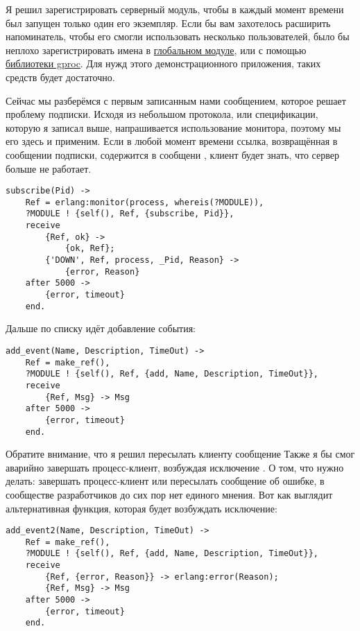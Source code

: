 Я решил зарегистрировать серверный модуль, чтобы в каждый момент времени был запущен только один его экземпляр.
Если бы вам захотелось расширить напоминатель, чтобы его смогли использовать несколько пользователей, было бы неплохо зарегистрировать имена в \href{http://erldocs.com/R15B/stdlib/global.html}{глобальном модуле}, или с помощью \href{http://github.com/uwiger/gproc}{библиотеки gproc}.
Для нужд этого демонстрационного приложения, таких средств будет достаточно.

Сейчас мы разберёмся с первым записанным нами сообщением, которое решает проблему подписки.
Исходя из небольшом протокола, или спецификации, которую я записал выше, напрашивается использование монитора, поэтому мы его здесь и применим.
Если в любой момент времени ссылка, возвращённая в сообщении подписки, содержится в сообщени , клиент будет знать, что сервер больше не работает.
\begin{lstlisting}[style=erlang]
subscribe(Pid) ->
    Ref = erlang:monitor(process, whereis(?MODULE)),
    ?MODULE ! {self(), Ref, {subscribe, Pid}},
    receive
        {Ref, ok} ->
            {ok, Ref};
        {'DOWN', Ref, process, _Pid, Reason} ->
            {error, Reason}
    after 5000 ->
        {error, timeout}
    end.
\end{lstlisting}

Дальше по списку идёт добавление события:
\begin{lstlisting}[style=erlang]
add_event(Name, Description, TimeOut) ->
    Ref = make_ref(),
    ?MODULE ! {self(), Ref, {add, Name, Description, TimeOut}},
    receive
        {Ref, Msg} -> Msg
    after 5000 ->
        {error, timeout}
    end.
\end{lstlisting}

Обратите внимание, что я решил пересылать клиенту сообщение 
Также я бы смог аварийно завершать процесс\--клиент, возбуждая исключение .
О том, что нужно делать: завершать процесс\--клиент или пересылать сообщение об ошибке, в сообществе разработчиков до сих пор нет единого мнения.
Вот как выглядит альтернативная функция, которая будет возбуждать исключение:
\begin{lstlisting}[style=erlang]
add_event2(Name, Description, TimeOut) ->
    Ref = make_ref(),
    ?MODULE ! {self(), Ref, {add, Name, Description, TimeOut}},
    receive
        {Ref, {error, Reason}} -> erlang:error(Reason);
        {Ref, Msg} -> Msg
    after 5000 ->
        {error, timeout}
    end.
\end{lstlisting}

